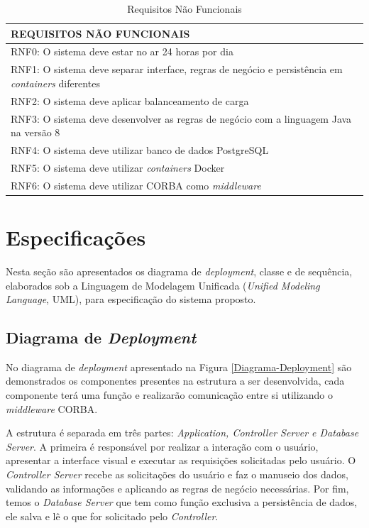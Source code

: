 	\begin{table}[!h]
		\caption{Requisitos Não Funcionais}
		\label{Req-Nao-Func}
		\begin{tabular}{|l|}
			\hline
			\textbf{REQUISITOS NÃO FUNCIONAIS} \\ \hline
			RNF0: O sistema deve estar no ar 24 horas por dia \\ \hline
			RNF1: O sistema deve separar interface, regras de negócio e persistência em \textit{containers} diferentes \\ \hline
			RNF2: O sistema deve aplicar balanceamento de carga \\ \hline
			RNF3: O sistema deve desenvolver as regras de negócio com a linguagem Java na versão 8\\ \hline
			RNF4: O sistema deve utilizar banco de dados PostgreSQL \\ \hline
			RNF5: O sistema deve utilizar \textit{containers} Docker \\ \hline
			RNF6: O sistema deve utilizar CORBA como \textit{middleware} \\ \hline
		\end{tabular}
	\end{table}

\section{Especificações}
	Nesta seção são apresentados os diagrama de \textit{deployment}, classe e de sequência, elaborados sob a Linguagem de Modelagem Unificada (\textit{Unified Modeling Language}, UML), para especificação do sistema proposto.
	
\subsection{Diagrama de \textit{Deployment}}
	No diagrama de \textit{deployment} apresentado na Figura \ref{Diagrama-Deployment} são demonstrados os componentes presentes na estrutura a ser desenvolvida, cada componente terá uma função e realizarão comunicação entre si utilizando o \textit{middleware} CORBA.
	
	A estrutura é separada em três partes: \textit{Application, Controller Server e Database Server}. A primeira é responsável por realizar a interação com o usuário, apresentar a interface visual e executar as requisições solicitadas pelo usuário. O \textit{Controller Server} recebe as solicitações do usuário e faz o manuseio dos dados, validando as informações e aplicando as regras de negócio necessárias. Por fim, temos o \textit{Database Server} que tem como função exclusiva a persistência de dados, ele salva e lê o que for solicitado pelo \textit{Controller}.
	
